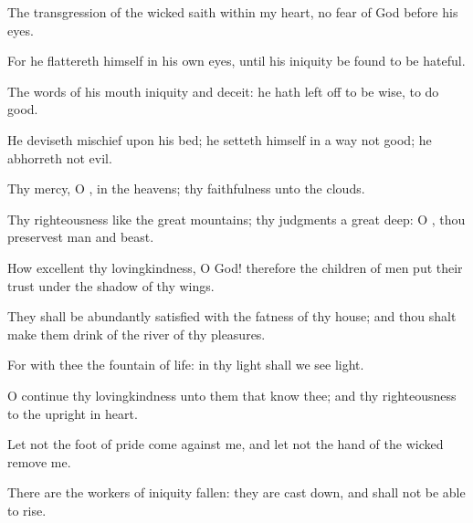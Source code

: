 {\Q {}The
transgression of the
wicked
saith
within my
heart,
{} no
fear of
God before his
eyes.


\par }{\Q {}For he
flattereth himself in his own
eyes, until his
iniquity be
found to be
hateful.


\par }{\Q {}The
words of his
mouth
{}
iniquity and
deceit: he hath left
off to be
wise,
{} to do
good.


\par }{\Q {}He
deviseth
mischief upon his
bed; he
setteth himself in a
way
{} not
good; he
abhorreth not
evil.


\par }{\BB \par }
{\Q {}Thy
mercy, O
{},
{} in the
heavens;
{} thy
faithfulness
{} unto the
clouds.


\par }{\Q {}Thy
righteousness
{} like the
great
mountains; thy
judgments
{} a
great
deep: O
{}, thou
preservest
man and
beast.


\par }{\Q {}How
excellent
{} thy
lovingkindness, O
God! therefore the
children of
men put their
trust under the
shadow of thy
wings.


\par }{\Q {}They shall be abundantly
satisfied with the
fatness of thy
house; and thou shalt make them
drink of the
river of thy
pleasures.


\par }{\Q {}For with thee
{} the
fountain of
life: in thy
light shall we
see
light.


\par }{\Q {}O
continue thy
lovingkindness unto them that
know thee; and thy
righteousness to the
upright in
heart.


\par }{\Q {}Let not the
foot of
pride
come against me, and let not the
hand of the
wicked
remove me.


\par }{\Q {}There are the
workers of
iniquity
fallen: they are cast
down, and shall not be
able to
rise.




\par }
